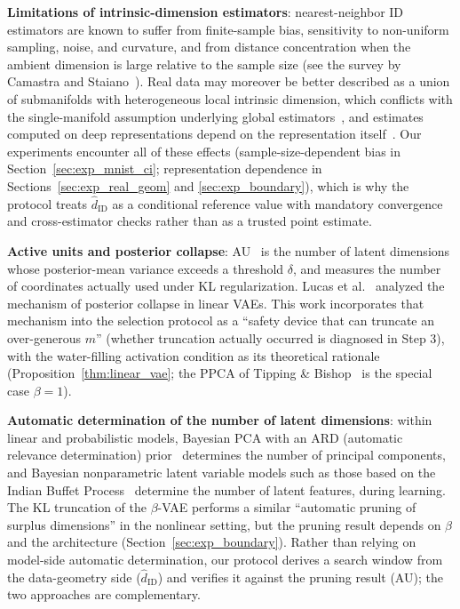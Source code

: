 \documentclass[make,article,submit,pdftex,moreauthors]{Definitions/mdpi}
\newcommand{\hatdID}{\hat{d}_{\mathrm{ID}}}
\begin{document}
\textbf{Limitations of intrinsic-dimension estimators}:
nearest-neighbor ID estimators are known to suffer from finite-sample bias,
sensitivity to non-uniform sampling, noise, and curvature, and from
distance concentration when the ambient dimension is large relative to the
sample size (see the survey by Camastra and
Staiano~\cite{camastra2016intrinsic}).
Real data may moreover be better described as a union of submanifolds with
heterogeneous local intrinsic dimension, which conflicts with the
single-manifold assumption underlying global
estimators~\cite{allegra2020data}, and estimates computed on deep
representations depend on the representation
itself~\cite{ansuini2019intrinsic,pope2021intrinsic}.
Our experiments encounter all of these effects (sample-size-dependent bias
in Section~\ref{sec:exp_mnist_ci}; representation dependence in
Sections~\ref{sec:exp_real_geom} and \ref{sec:exp_boundary}), which is why
the protocol treats $\hatdID$ as a conditional reference value with
mandatory convergence and cross-estimator checks rather than as a trusted
point estimate.

\textbf{Active units and posterior collapse}:
AU~\cite{higgins2017betavae,lucas2019elbo} is the number of latent
dimensions whose posterior-mean variance exceeds a threshold $\delta$, and
measures the number of coordinates actually used under KL regularization.
Lucas et al.~\cite{lucas2019elbo} analyzed the mechanism of posterior
collapse in linear VAEs.
This work incorporates that mechanism into the selection protocol as a
``safety device that can truncate an over-generous $m$'' (whether truncation
actually occurred is diagnosed in Step 3), with the water-filling activation
condition as its theoretical rationale
(Proposition~\ref{thm:linear_vae}; the PPCA of Tipping \&
Bishop~\cite{tippingbishop1999ppca} is the special case $\beta = 1$).

\textbf{Automatic determination of the number of latent dimensions}:
within linear and probabilistic models, Bayesian PCA with an ARD (automatic
relevance determination) prior~\cite{bishop1999bayesian} determines the
number of principal components, and Bayesian nonparametric latent variable
models such as those based on the Indian Buffet
Process~\cite{ghahramani2005infinite} determine the number of latent
features, during learning.
The KL truncation of the $\beta$-VAE performs a similar ``automatic pruning
of surplus dimensions'' in the nonlinear setting, but the pruning result
depends on $\beta$ and the architecture (Section~\ref{sec:exp_boundary}).
Rather than relying on model-side automatic determination, our protocol
derives a search window from the data-geometry side ($\hatdID$) and
verifies it against the pruning result (AU); the two approaches are
complementary.
\end{document}
